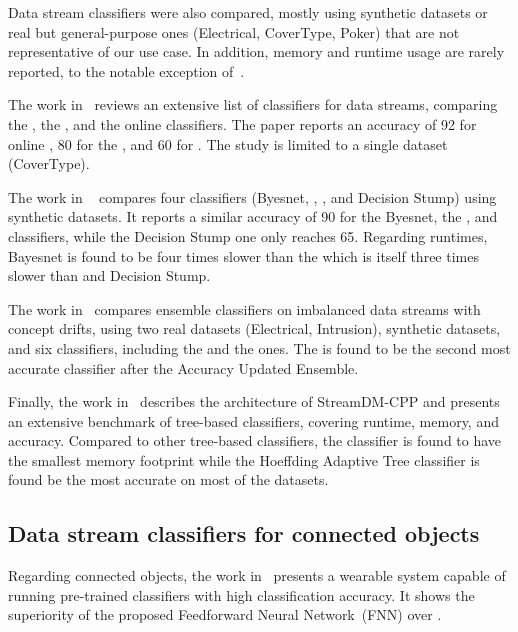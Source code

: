 Data stream classifiers were also compared, mostly using synthetic datasets
or real but general-purpose ones (Electrical, CoverType, Poker) that are
not representative of our use case. In addition, memory and runtime usage 
are rarely reported, to the notable exception of~\cite{StreamDM-CPP}.

The work
in~\cite{prasad2016stream} reviews an extensive list of classifiers for
data streams, comparing the \hoeffdingtree, the \naivebayes, and the \knn
online classifiers. The paper reports an accuracy of 92 for online \knn, 80
for the \hoeffdingtree, and 60 for \naivebayes. The study is limited to a
single dataset (CoverType). 

The work in ~\cite{kaur2020} compares four classifiers (Byesnet,
\hoeffdingtree, \naivebayes, and Decision Stump) using synthetic datasets.
It reports a similar accuracy of 90 for the Byesnet, the
\hoeffdingtree, and \naivebayes classifiers, while the Decision Stump one
only reaches 65. Regarding runtimes, Bayesnet is found to be four times
slower than the \hoeffdingtree which is itself three times slower than
\naivebayes and Decision Stump.

The work in~\cite{priya2020comprehensive} compares ensemble classifiers on
imbalanced data streams with concept drifts, using two real datasets
(Electrical, Intrusion), synthetic datasets, and six classifiers, including the
\naivebayes and the \hoeffdingtree ones. The \hoeffdingtree is found to be
the second most accurate classifier after the Accuracy Updated Ensemble.

Finally, the work in~\cite{StreamDM-CPP} describes the architecture of
StreamDM-CPP and presents an extensive benchmark of tree-based classifiers,
covering runtime, memory, and accuracy. Compared to other tree-based
classifiers, the \hoeffdingtree classifier is found to have the smallest
memory footprint while the Hoeffding Adaptive Tree classifier is found be
the most accurate on most of the datasets. 

\subsection{Data stream classifiers for connected objects}

Regarding connected objects, the work in~\cite{omid_2019} presents a wearable
system capable of running pre-trained classifiers with high classification
accuracy. It shows the superiority of the proposed Feedforward Neural
Network~(FNN) over \knn.

